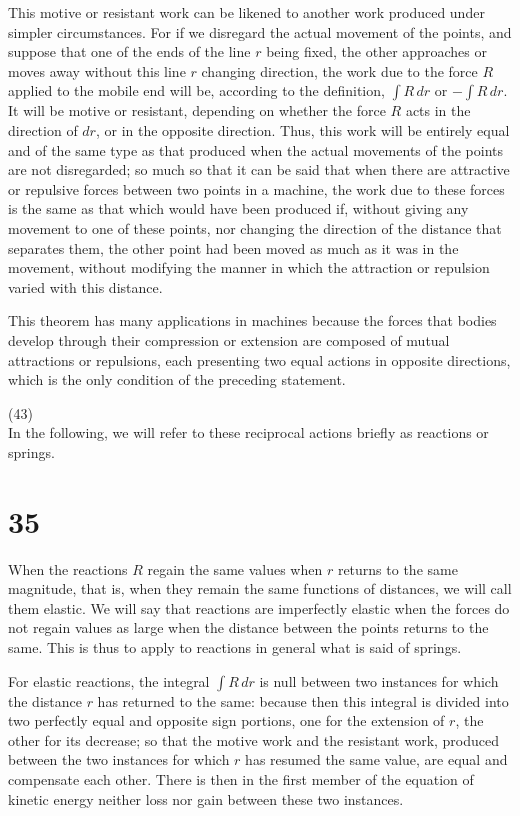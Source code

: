 \documentclass{book}
\begin{document}
This motive or resistant work can be likened to another work produced under simpler circumstances. For if we disregard the actual movement of the points, and suppose that one of the ends of the line \( r \) being fixed, the other approaches or moves away without this line \( r \) changing direction, the work due to the force \( R \) applied to the mobile end will be, according to the definition, \( \int R \, dr \) or \( -\int R \, dr \). It will be motive or resistant, depending on whether the force \( R \) acts in the direction of \( dr \), or in the opposite direction. Thus, this work will be entirely equal and of the same type as that produced when the actual movements of the points are not disregarded; so much so that it can be said that when there are attractive or repulsive forces between two points in a machine, the work due to these forces is the same as that which would have been produced if, without giving any movement to one of these points, nor changing the direction of the distance that separates them, the other point had been moved as much as it was in the movement, without modifying the manner in which the attraction or repulsion varied with this distance.

This theorem has many applications in machines because the forces that bodies develop through their compression or extension are composed of mutual attractions or repulsions, each presenting two equal actions in opposite directions, which is the only condition of the preceding statement.

\newpage
(43) \\
In the following, we will refer to these reciprocal actions briefly as reactions or springs.

\section{35}
When the reactions \( R \) regain the same values when \( r \) returns to the same magnitude, that is, when they remain the same functions of distances, we will call them elastic. We will say that reactions are imperfectly elastic when the forces do not regain values as large when the distance between the points returns to the same. This is thus to apply to reactions in general what is said of springs.

For elastic reactions, the integral \( \int R \, dr \) is null between two instances for which the distance \( r \) has returned to the same: because then this integral is divided into two perfectly equal and opposite sign portions, one for the extension of \( r \), the other for its decrease; so that the motive work and the resistant work, produced between the two instances for which \( r \) has resumed the same value, are equal and compensate each other. There is then in the first member of the equation of kinetic energy neither loss nor gain between these two instances.
\end{document}
